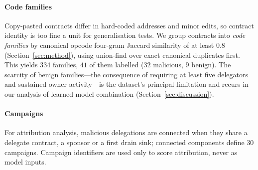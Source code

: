 \paragraph{Code families} Copy-pasted contracts differ in hard-coded addresses and minor edits, so contract identity is too fine a unit for generalisation tests. We group contracts into \emph{code families} by canonical opcode four-gram Jaccard similarity of at least $0.8$ (Section~\ref{sec:method}), using union-find over exact canonical duplicates first. This yields $334$ families, $41$ of them labelled ($32$ malicious, $9$ benign). The scarcity of benign families---the consequence of requiring at least five delegators and sustained owner activity---is the dataset's principal limitation and recurs in our analysis of learned model combination (Section~\ref{sec:discussion}).

\paragraph{Campaigns} For attribution analysis, malicious delegations are connected when they share a delegate contract, a sponsor or a first drain sink; connected components define $30$ campaigns. Campaign identifiers are used only to score attribution, never as model inputs.
